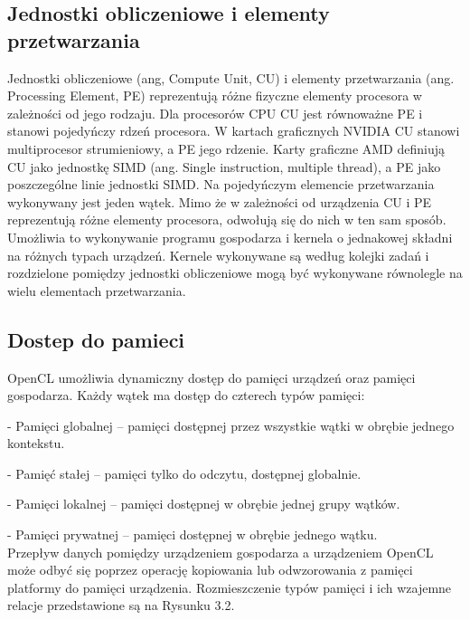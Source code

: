 \subsection{Jednostki obliczeniowe i elementy przetwarzania}\label{sec:OpenC3L}

Jednostki obliczeniowe (ang, Compute Unit, CU) i elementy przetwarzania (ang. Processing Element, PE) reprezentują różne fizyczne elementy procesora w zależności od jego rodzaju. Dla procesorów CPU CU jest równoważne PE i stanowi pojedyńczy rdzeń procesora. W kartach graficznych NVIDIA CU stanowi multiprocesor strumieniowy, a PE jego rdzenie. Karty graficzne AMD definiują CU jako jednostkę SIMD (ang. Single instruction, multiple thread), a PE jako poszczególne linie jednostki SIMD. Na pojedyńczym elemencie przetwarzania wykonywany jest jeden wątek. Mimo że w zależności od urządzenia CU i PE reprezentują różne elementy procesora, odwołują się do nich w ten sam sposób. Umożliwia to wykonywanie programu gospodarza i kernela o jednakowej składni na różnych typach urządzeń. Kernele wykonywane są według kolejki zadań i rozdzielone pomiędzy jednostki obliczeniowe mogą być wykonywane równolegle na wielu elementach przetwarzania.

\subsection{Dostep do pamieci}\label{sec:OpenC6L}

OpenCL umożliwia dynamiczny dostęp do pamięci urządzeń oraz pamięci gospodarza. Każdy wątek ma dostęp do czterech typów pamięci:

- Pamięci globalnej – pamięci dostępnej przez wszystkie wątki w obrębie jednego kontekstu.

- Pamięć stałej – pamięci tylko do odczytu, dostępnej globalnie.

- Pamięci lokalnej – pamięci dostępnej w obrębie jednej grupy wątków.

- Pamięci prywatnej – pamięci dostępnej w obrębie jednego wątku.\\

Przepływ danych pomiędzy urządzeniem gospodarza a urządzeniem OpenCL może odbyć się poprzez operację kopiowania  lub odwzorowania z pamięci platformy do pamięci urządzenia. Rozmieszczenie typów pamięci i ich wzajemne relacje przedstawione są na Rysunku 3.2.

